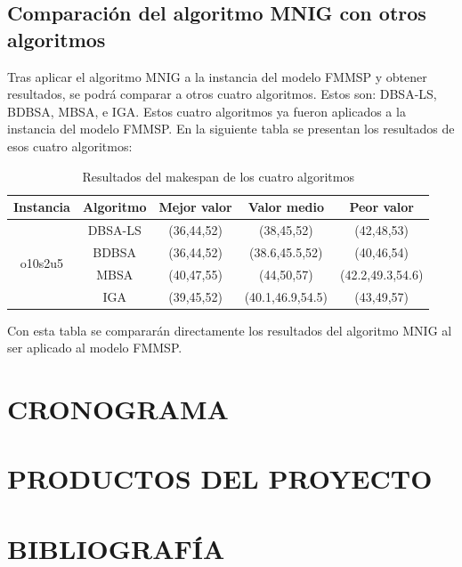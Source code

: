 \documentclass{article}
\begin{document}
\subsection{Comparación del algoritmo MNIG con otros algoritmos}

Tras aplicar el algoritmo MNIG a la instancia del modelo FMMSP y obtener
resultados, se podrá comparar a otros cuatro algoritmos. Estos son: DBSA-LS,
BDBSA, MBSA, e IGA. Estos cuatro algoritmos ya fueron aplicados a la instancia
del modelo FMMSP. En la siguiente tabla se presentan los resultados de esos 
cuatro algoritmos: \autocite{modFMMSP}

\begin{table}[h]
    \caption{Resultados del makespan de los cuatro algoritmos}
    \label{tab:algs}
    \begin{center}
    \begin{tabular}{ccccc}
        \hline
        Instancia & Algoritmo & Mejor valor & Valor medio & Peor valor\\
        \hline
        \multirow{4}{*}{o10s2u5} & DBSA-LS & (36,44,52) & (38,45,52) & (42,48,53)\\
         & BDBSA & (36,44,52) & (38.6,45.5,52) & (40,46,54)\\
         & MBSA & (40,47,55) & (44,50,57) & (42.2,49.3,54.6)\\
         & IGA & (39,45,52) & (40.1,46.9,54.5) & (43,49,57)\\
        \hline
    \end{tabular}
    \end{center}
\end{table}

Con esta tabla se compararán directamente los resultados del algoritmo MNIG
al ser aplicado al modelo FMMSP.


\section{CRONOGRAMA}



\section{PRODUCTOS DEL PROYECTO}



\section{BIBLIOGRAFÍA}

\printbibliography[heading=none]
\end{document}
